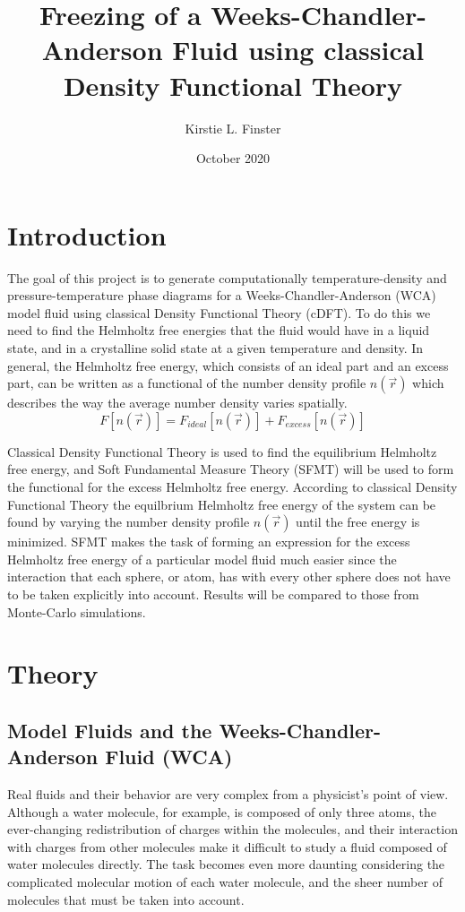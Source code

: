 \documentclass[double,12pt]{beavtex}
\title{Freezing of a Weeks-Chandler-Anderson Fluid using classical Density Functional Theory}
\author{Kirstie L. Finster}
\date{October 2020}
\begin{document}
   \maketitle
   \mainmatter

\chapter{Introduction}

The goal of this project is to generate computationally temperature-density 
and pressure-temperature phase diagrams for a Weeks-Chandler-Anderson (WCA) 
model fluid using classical Density Functional Theory (cDFT). 
To do this we need to find the Helmholtz free energies that the fluid
would have in a liquid state, and in a crystalline solid state 
at a given temperature and density. 
In general, the Helmholtz free energy, which consists of an ideal part 
and an excess part, can be written as a functional of the number density 
profile $n(\vec{r})$ which describes the way the average number 
density varies spatially. 
\begin{equation}{F[n(\vec{r})]=F_{ideal}[n(\vec{r})] + F_{excess}[n(\vec{r})]}\end{equation} 

Classical Density Functional Theory is used to find the equilibrium 
Helmholtz free energy, and Soft Fundamental Measure Theory (SFMT) will 
be used to form the functional for the excess Helmholtz free energy. 
According to classical Density Functional Theory the equilbrium 
Helmholtz free energy of the system can be found by varying the number 
density profile $n(\vec{r})$ until the free energy is minimized. 
SFMT makes the task of forming an expression
for the excess Helmholtz free energy of a particular model fluid 
much easier since the interaction that each sphere, or atom, 
has with every other sphere does not have to be taken explicitly into account.
Results will be compared to those from Monte-Carlo simulations.

\chapter{Theory}

\section{Model Fluids and the Weeks-Chandler-Anderson Fluid (WCA)}

Real fluids and their behavior are very complex from a physicist's point 
of view. Although a water molecule, for example, is composed of only three
atoms, the ever-changing redistribution of charges within the molecules, 
and their interaction with charges from other molecules make it difficult 
to study a fluid composed of water molecules directly. The task becomes 
even more daunting considering the complicated molecular motion of each 
water molecule, and the sheer number of molecules that must be taken 
into account. 
\end{document}
